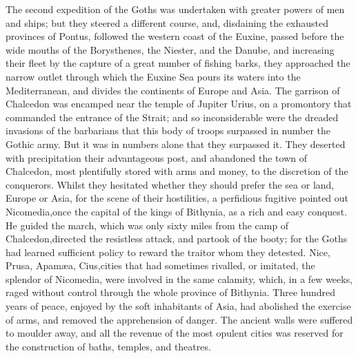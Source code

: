 




The second expedition of the Goths was undertaken with greater
powers of men and ships; but they steered a different course,
and, disdaining the exhausted provinces of Pontus, followed the
western coast of the Euxine, passed before the wide mouths of the
Borysthenes, the Niester, and the Danube, and increasing their
fleet by the capture of a great number of fishing barks, they
approached the narrow outlet through which the Euxine Sea pours
its waters into the Mediterranean, and divides the continents of
Europe and Asia. The garrison of Chalcedon was encamped near the
temple of Jupiter Urius, on a promontory that commanded the
entrance of the Strait; and so inconsiderable were the dreaded
invasions of the barbarians that this body of troops surpassed in
number the Gothic army. But it was in numbers alone that they
surpassed it. They deserted with precipitation their advantageous
post, and abandoned the town of Chalcedon, most plentifully
stored with arms and money, to the discretion of the conquerors.
Whilst they hesitated whether they should prefer the sea or land,
Europe or Asia, for the scene of their hostilities, a perfidious
fugitive pointed out Nicomedia,\footnotemark[1111] once the capital of the
kings of Bithynia, as a rich and easy conquest. He guided the
march, which was only sixty miles from the camp of Chalcedon,\footnotemark[112]
directed the resistless attack, and partook of the booty; for the
Goths had learned sufficient policy to reward the traitor whom
they detested. Nice, Prusa, Apamæa, Cius,\footnotemark[1121] cities that had
sometimes rivalled, or imitated, the splendor of Nicomedia, were
involved in the same calamity, which, in a few weeks, raged
without control through the whole province of Bithynia. Three
hundred years of peace, enjoyed by the soft inhabitants of Asia,
had abolished the exercise of arms, and removed the apprehension
of danger. The ancient walls were suffered to moulder away, and
all the revenue of the most opulent cities was reserved for the
construction of baths, temples, and theatres.\footnotemark[113]

